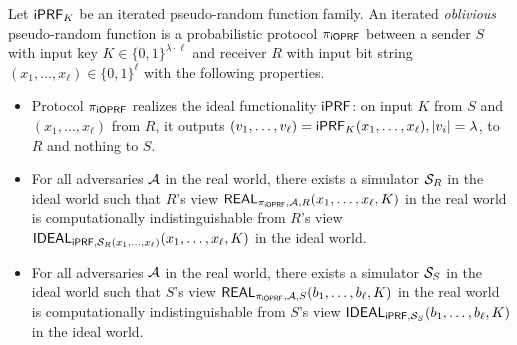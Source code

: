 \begin{definition}[$\proto$]
  Let $\mathsf{i}\mathsf{PRF}_K$ be an iterated pseudo-random function family.  An
  iterated \emph{oblivious} pseudo-random function is a probabilistic
  protocol $\proto$ between a sender $S$ with input key
  $K\in\{0,1\}^{\lambda\cdot\ell}$ and receiver $R$ with input bit string
  $(x_1,\ldots,x_\ell)\in\{0,1\}^{\ell}$ with the following
  properties.

  \begin{itemize}
   
\item Protocol $\proto$ realizes the ideal functionality $\mathsf{i}\mathsf{PRF}$: on
  input $K$ from $S$ and $(x_1,\ldots,x_\ell)$ from $R$, it outputs
  $(v_1,\ldots,v_\ell)=\mathsf{i}\mathsf{PRF}_K(x_1,\ldots,x_\ell),|v_i|=\lambda$, to
  $R$ and nothing to $S$.
  
\item For all adversaries ${\mathcal{A}}$ in the real world, there exists a
  simulator ${\mathcal{S}}_R$ in the ideal world such that $R$'s view
  $\mathsf{REAL}_{{\pi_{\mathsf{i}\mathsf{OPRF}}},{\mathcal{A}},R}(x_1,\ldots,x_\ell,K)$ in the real world is
  computationally indistinguishable from $R$'s view
  $\mathsf{IDEAL}_{\mathsf{i}\mathsf{PRF},{\mathcal{S}}_R(x_1,\ldots,x_\ell)}(x_1,\ldots,x_\ell,K)$ in
  the ideal world.

\item
   For all adversaries ${\mathcal{A}}$ in the real world, there exists a
  simulator ${\mathcal{S}}_S$ in the ideal world such that $S$'s view
  $\mathsf{REAL}_{{\pi_{\mathsf{i}\mathsf{OPRF}}},{\mathcal{A}},S}(b_1,\ldots,b_\ell,K)$ in the real world is
  computationally indistinguishable from $S$'s view
  $\mathsf{IDEAL}_{\mathsf{i}\mathsf{PRF},{\mathcal{S}}_S}(b_1,\ldots,b_\ell,K)$ in
  the ideal world.  
\end{itemize}
\end{definition}

